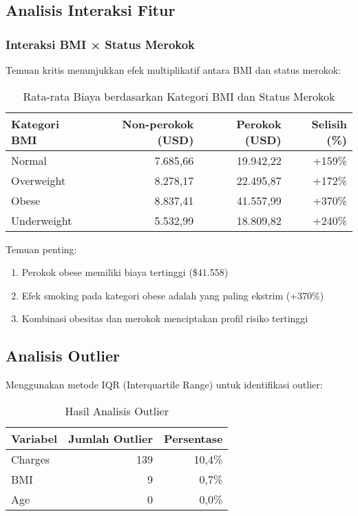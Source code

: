 \subsection{Analisis Interaksi Fitur}
\label{subsec:interaksi-fitur}

\subsubsection{Interaksi BMI × Status Merokok}
Temuan kritis menunjukkan efek multiplikatif antara BMI dan status merokok:

\begin{table}[H]
\centering
\caption{Rata-rata Biaya berdasarkan Kategori BMI dan Status Merokok}
\label{tab:bmi-smoking-interaction}
\begin{tabular}{|l|r|r|r|}
\hline
\textbf{Kategori BMI} & \textbf{Non-perokok (USD)} & \textbf{Perokok (USD)} & \textbf{Selisih (\%)} \\
\hline
Normal & 7.685,66 & 19.942,22 & +159\% \\
Overweight & 8.278,17 & 22.495,87 & +172\% \\
Obese & 8.837,41 & 41.557,99 & +370\% \\
Underweight & 5.532,99 & 18.809,82 & +240\% \\
\hline
\end{tabular}
\end{table}

Temuan penting:
\begin{enumerate}
    \item Perokok obese memiliki biaya tertinggi (\$41.558)
    \item Efek smoking pada kategori obese adalah yang paling ekstrim (+370\%)
    \item Kombinasi obesitas dan merokok menciptakan profil risiko tertinggi
\end{enumerate}

\subsection{Analisis Outlier}
\label{subsec:analisis-outlier}

Menggunakan metode IQR (Interquartile Range) untuk identifikasi outlier:

\begin{table}[H]
\centering
\caption{Hasil Analisis Outlier}
\label{tab:outlier-analysis}
\begin{tabular}{|l|r|r|}
\hline
\textbf{Variabel} & \textbf{Jumlah Outlier} & \textbf{Persentase} \\
\hline
Charges & 139 & 10,4\% \\
BMI & 9 & 0,7\% \\
Age & 0 & 0,0\% \\
\hline
\end{tabular}
\end{table}

